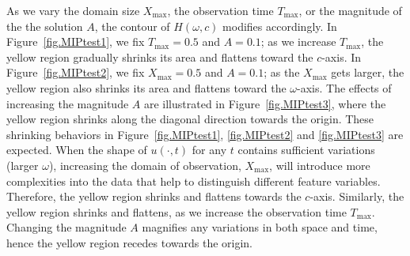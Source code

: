\documentclass[a4paper,11pt]{article}
\theoremstyle{definition}
\begin{document}
As we vary the domain size $X_{\max}$, the observation time $T_{\max}$, or the magnitude of the the solution $A$, the contour of $H(\omega,c)$ modifies accordingly.  In Figure~\ref{fig.MIPtest1}, we fix $T_{\max}=0.5$ and $A=0.1$; as we increase $T_{\max}$, the yellow region gradually shrinks its area and flattens toward the $c$-axis. In Figure~\ref{fig.MIPtest2}, we fix $X_{\max}=0.5$ and $A=0.1$; as the $X_{\max}$ gets larger, the yellow region also shrinks its area and flattens toward the $\omega$-axis. The effects of increasing the magnitude $A$ are illustrated in Figure~\ref{fig.MIPtest3}, where the yellow region shrinks along the diagonal direction towards the origin.
%
These shrinking behaviors in Figure~\ref{fig.MIPtest1}, \ref{fig.MIPtest2} and \ref{fig.MIPtest3} are expected. When the shape of $u(\cdot,t)$ for any $t$ contains sufficient variations (larger $\omega$), increasing the domain of observation, $X_{\max}$, will introduce more complexities into the data that help to distinguish different feature variables. Therefore, the yellow region shrinks and flattens towards the $c$-axis.  Similarly, the yellow region shrinks and flattens, as we increase the observation time $T_{\max}$. Changing the magnitude $A$ magnifies any variations in both space and time, hence the yellow region recedes towards the origin.
\end{document}
